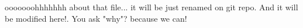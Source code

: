 ooooooohhhhhhh
about that file...
it will be just renamed on git repo.
And it will be modified here!.
You ask "why"?
because we can!
